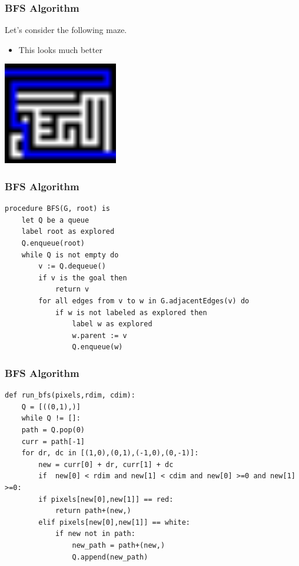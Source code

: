 \documentclass{beamer}
\begin{document}
            \begin{frame}
                \frametitle{BFS Algorithm}
                Let's consider the following maze.
                \begin{itemize}
                    \item This looks much better
    
                \end{itemize}

                \includegraphics[width=5cm,scale=2]{../bfs_out.png}
            
                
                \end{frame}
                \begin{frame}[fragile]
                    \frametitle{BFS Algorithm}
    \begin{lstlisting}
procedure BFS(G, root) is
    let Q be a queue
    label root as explored
    Q.enqueue(root)
    while Q is not empty do
        v := Q.dequeue()
        if v is the goal then
            return v
        for all edges from v to w in G.adjacentEdges(v) do
            if w is not labeled as explored then
                label w as explored
                w.parent := v
                Q.enqueue(w)
\end{lstlisting}
    
                \end{frame}


                \begin{frame}[fragile]
                    \frametitle{BFS Algorithm}
    \begin{lstlisting}
def run_bfs(pixels,rdim, cdim):
    Q = [((0,1),)]
    while Q != []:
    path = Q.pop(0)
    curr = path[-1]
    for dr, dc in [(1,0),(0,1),(-1,0),(0,-1)]:
        new = curr[0] + dr, curr[1] + dc
        if  new[0] < rdim and new[1] < cdim and new[0] >=0 and new[1] >=0:
        if pixels[new[0],new[1]] == red:
            return path+(new,)
        elif pixels[new[0],new[1]] == white:
            if new not in path:
                new_path = path+(new,)
                Q.append(new_path)
\end{lstlisting}
    
                \end{frame}
\end{document}
